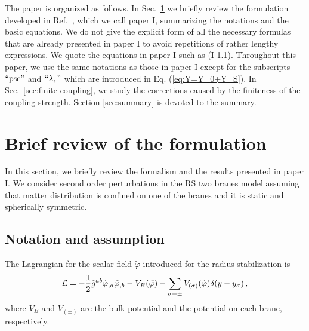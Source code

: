 \documentclass[a4paper,showpacs,preprintnumbers,amsmath,amssymb]{revtex4}
\begin{document}
The paper is organized as follows. In Sec.~\ref{sec:review} we briefly review the formulation developed in Ref.~\cite{Kudoh:2001kz}, which we call paper I, summarizing the notations and the basic equations.  
We do not give the explicit form of all the necessary formulas that are already presented in paper I to avoid repetitions of rather lengthy expressions. 
We quote the equations in paper I such as (I-1.1).  
Throughout this paper, we use the same notations as those in paper I except for the subscripts ${`` \mathrm{pse}" }$ and ${``\lambda,"}$ which are introduced in Eq. (\ref{eq:Y=Y_0+Y_S}).  
In Sec.~\ref{sec:finite coupling}, we study the corrections caused by the finiteness of the coupling strength.  
Section \ref{sec:summary} is devoted to the summary. 





\section{Brief review of the formulation}
\label{sec:review}


In this section, we briefly review the formalism and the results presented in paper I.  
We consider second order perturbations in the RS two branes model assuming that matter distribution is confined on one of the branes and it is static and spherically symmetric.   


\subsection{Notation and assumption}

The Lagrangian for the scalar field $\tilde\varphi$ introduced for the radius stabilization is  
\begin{equation}
 {\cal L}= - \frac{1}{2} \tilde  g^{ab} 
     \tilde\varphi_{,a} \tilde\varphi_{,b}
          -V_B(\tilde\varphi)
          -\sum_{\sigma=\pm} V_{(\sigma)}(\tilde\varphi)
              \delta(y-y_{\sigma}) \,,
\label{eq:Lagrangian}
\end{equation}
where $V_B$ and $V_{(\pm)}$ are the bulk potential and the potential on each brane, respectively.  
\end{document}
